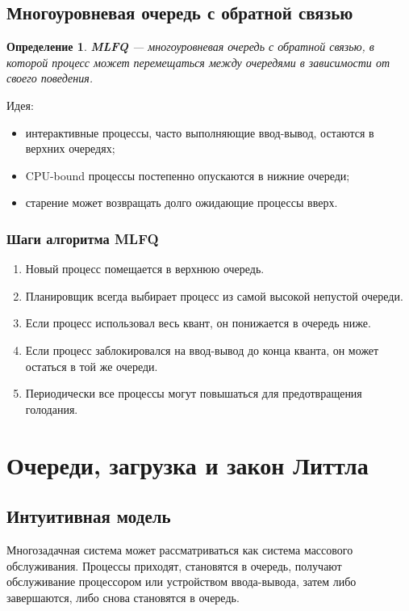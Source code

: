 \documentclass[12pt,a4paper]{article}
\newtheorem{definition}{Определение}
\begin{document}
\subsection{Многоуровневая очередь с обратной связью}

\begin{definition}
\textbf{MLFQ} --- многоуровневая очередь с обратной связью, в которой процесс может перемещаться между очередями в зависимости от своего поведения.
\end{definition}

Идея:

\begin{itemize}
    \item интерактивные процессы, часто выполняющие ввод-вывод, остаются в верхних очередях;
    \item CPU-bound процессы постепенно опускаются в нижние очереди;
    \item старение может возвращать долго ожидающие процессы вверх.
\end{itemize}

\subsubsection*{Шаги алгоритма MLFQ}

\begin{enumerate}
    \item Новый процесс помещается в верхнюю очередь.
    \item Планировщик всегда выбирает процесс из самой высокой непустой очереди.
    \item Если процесс использовал весь квант, он понижается в очередь ниже.
    \item Если процесс заблокировался на ввод-вывод до конца кванта, он может остаться в той же очереди.
    \item Периодически все процессы могут повышаться для предотвращения голодания.
\end{enumerate}

\section{Очереди, загрузка и закон Литтла}

\subsection{Интуитивная модель}

Многозадачная система может рассматриваться как система массового обслуживания. Процессы приходят, становятся в очередь, получают обслуживание процессором или устройством ввода-вывода, затем либо завершаются, либо снова становятся в очередь.
\end{document}

